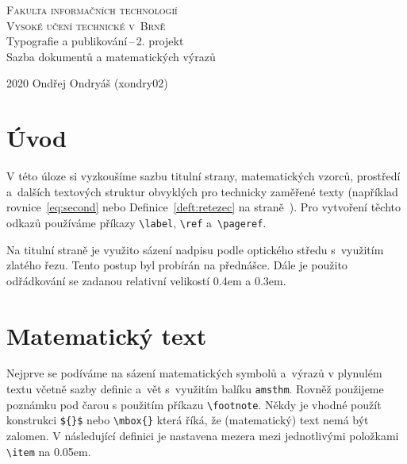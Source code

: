 \documentclass[twocolumn,11pt]{article}
\theoremstyle{plain}
\begin{document}
\begin{titlepage}
\begin{center}
\Huge\textsc{Fakulta informačních technologií}\\\textsc{Vysoké učení technické v~Brně}\\
\LARGE
Typografie a publikování\,--\,2. projekt\\
Sazba dokumentů a matematických výrazů\\
\end{center}
{\Large 2020 \hfill Ondřej Ondryáš (xondry02)}
\end{titlepage}

\section*{Úvod}
V této úloze si vyzkoušíme sazbu titulní strany, matematických vzorců, prostředí a~dalších textových struktur obvyklých pro technicky zaměřené texty (například rovnice~\eqref{eq:second} nebo Definice~\ref{deft:retezec} na straně~\pageref{deft:retezec}). Pro vytvoření těchto odkazů používáme příkazy \verb|\label|, \verb|\ref| a~\verb|\pageref|.

Na titulní straně je využito sázení nadpisu podle optického středu s~využitím zlatého řezu. Tento postup byl probírán na přednášce. Dále je použito odřádkování se zadanou relativní velikostí 0.4em a 0.3em.

\section{Matematický text}
Nejprve se podíváme na sázení matematických symbolů a~výrazů v plynulém textu včetně sazby definic a~vět s~využitím balíku \verb|amsthm|. Rovněž použijeme poznámku pod čarou s použitím příkazu \verb|\footnote|. Někdy je vhodné použít konstrukci \verb|${}$| nebo \verb|\mbox{}| která říká, že (matematický) text nemá být zalomen. V následující definici je nastavena mezera mezi jednotlivými položkami \verb|\item| na 0.05em.
\end{document}
